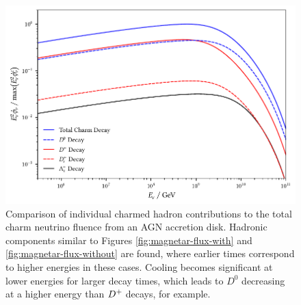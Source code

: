 \begin{figure}[H]
	\centering
	\includegraphics{../plots/build/nucleus_charm_decay_comparison.pdf}
	\caption[AGN accretion disk $\nu \kern+0.5pt$ fluence from $c$ decay.]
			{Comparison of individual charmed hadron contributions to the total charm neutrino fluence
			 from an AGN accretion disk. Hadronic components similar to Figures \ref{fig:magnetar-flux-with}
			 and \ref{fig:magnetar-flux-without} are found, where earlier times correspond to higher energies
			 in these cases. Cooling becomes significant at lower energies for larger decay times, which leads
			 to $D^0$ decreasing at a higher energy than $D^+ \kern-0.5pt$ decays, for example.}
	\label{fig:nucleus-charm-comparison}
\end{figure}
